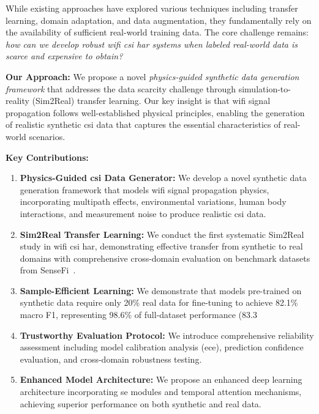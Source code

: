 \documentclass[journal]{IEEEtran}
\begin{document}
While existing approaches have explored various techniques including transfer learning, domain adaptation, and data augmentation, they fundamentally rely on the availability of sufficient real-world training data. The core challenge remains: \textit{how can we develop robust \gls{wifi} \gls{csi} \gls{har} systems when labeled real-world data is scarce and expensive to obtain?}

\textbf{Our Approach:} We propose a novel \textit{physics-guided synthetic data generation framework} that addresses the data scarcity challenge through simulation-to-reality (Sim2Real) transfer learning. Our key insight is that \gls{wifi} signal propagation follows well-established physical principles, enabling the generation of realistic synthetic \gls{csi} data that captures the essential characteristics of real-world scenarios.

\textbf{Key Contributions:}
\begin{enumerate}
\item \textbf{Physics-Guided \gls{csi} Data Generator:} We develop a novel synthetic data generation framework that models \gls{wifi} signal propagation physics, incorporating multipath effects, environmental variations, human body interactions, and measurement noise to produce realistic \gls{csi} data.

\item \textbf{Sim2Real Transfer Learning:} We conduct the first systematic Sim2Real study in \gls{wifi} \gls{csi} \gls{har}, demonstrating effective transfer from synthetic to real domains with comprehensive cross-domain evaluation on benchmark datasets from SenseFi~\cite{yang2023sensefi}.

\item \textbf{Sample-Efficient Learning:} We demonstrate that models pre-trained on synthetic data require only 20\% real data for fine-tuning to achieve 82.1\% macro F1, representing 98.6\% of full-dataset performance (83.3%

\item \textbf{Trustworthy Evaluation Protocol:} We introduce comprehensive reliability assessment including model calibration analysis (\gls{ece}), prediction confidence evaluation, and cross-domain robustness testing.

\item \textbf{Enhanced Model Architecture:} We propose an enhanced deep learning architecture incorporating \gls{se} modules and temporal attention mechanisms, achieving superior performance on both synthetic and real data.
\end{enumerate}
\end{document}
